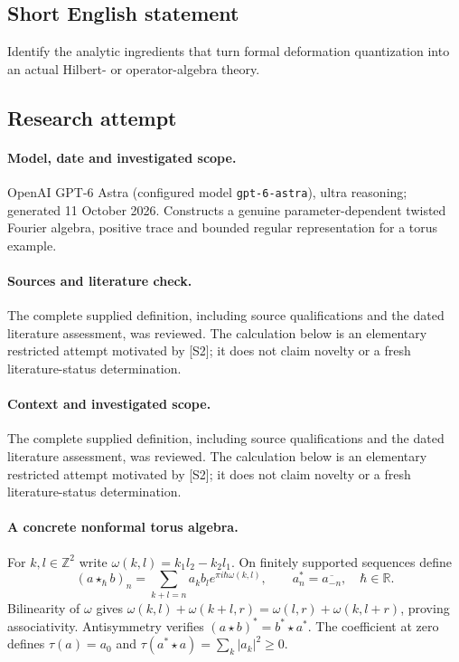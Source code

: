 \documentclass[11pt]{article}
\begin{document}
\subsection{Short English statement}
Identify the analytic ingredients that turn formal deformation quantization into an actual Hilbert- or operator-algebra theory.
\subsection{Research attempt}
\paragraph{Model, date and investigated scope.}
OpenAI GPT-6 Astra (configured model \texttt{gpt-6-astra}), ultra reasoning; generated 11 October 2026. Constructs a genuine parameter-dependent twisted Fourier algebra, positive trace and bounded regular representation for a torus example.

\paragraph{Sources and literature check.}
The complete supplied definition, including source qualifications and the dated literature assessment, was reviewed. The calculation below is an elementary restricted attempt motivated by [S2]; it does not claim novelty or a fresh literature-status determination.

\paragraph{Context and investigated scope.} The complete supplied definition, including source qualifications and the dated literature assessment, was reviewed. The calculation below is an elementary restricted attempt motivated by [S2]; it does not claim novelty or a fresh literature-status determination.

\paragraph{A concrete nonformal torus algebra.} For $k,l\in\mathbb Z^2$ write $\omega(k,l)=k_1l_2-k_2l_1$. On finitely supported sequences define
\[
 (a\star_\hbar b)_n=\sum_{k+l=n}a_kb_l e^{\pi i\hbar\omega(k,l)},\qquad
 a^*_n=\overline{a_{-n}},\quad\hbar\in\mathbb R.
\]
Bilinearity of $\omega$ gives $\omega(k,l)+\omega(k+l,r)=\omega(l,r)+\omega(k,l+r)$, proving associativity. Antisymmetry verifies $(a\star b)^*=b^*\star a^*$. The coefficient at zero defines $\tau(a)=a_0$ and $\tau(a^*\star a)=\sum_k|a_k|^2\geq0$.
\end{document}
